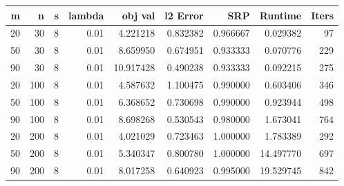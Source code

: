 \begin{tabular}{rrrrrrrrr}
\toprule
 m &   n &  s &  lambda &   obj val &  l2 Error &      SRP &   Runtime &  Iters \\
\midrule
20 &  30 &  8 &    0.01 &  4.221218 &  0.832382 & 0.966667 &  0.029382 &     97 \\
50 &  30 &  8 &    0.01 &  8.659950 &  0.674951 & 0.933333 &  0.070776 &    229 \\
90 &  30 &  8 &    0.01 & 10.917428 &  0.490238 & 0.933333 &  0.092215 &    275 \\
20 & 100 &  8 &    0.01 &  4.587632 &  1.100475 & 0.990000 &  0.603406 &    346 \\
50 & 100 &  8 &    0.01 &  6.368652 &  0.730698 & 0.990000 &  0.923944 &    498 \\
90 & 100 &  8 &    0.01 &  8.698268 &  0.530543 & 0.980000 &  1.673041 &    764 \\
20 & 200 &  8 &    0.01 &  4.021029 &  0.723463 & 1.000000 &  1.783389 &    292 \\
50 & 200 &  8 &    0.01 &  5.340347 &  0.800780 & 1.000000 & 14.497770 &    697 \\
90 & 200 &  8 &    0.01 &  8.017258 &  0.640923 & 0.995000 & 19.529745 &    842 \\
\bottomrule
\end{tabular}
